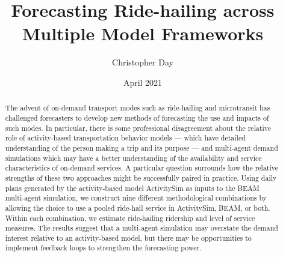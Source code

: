 \documentclass[fancy, masters]{byuthesis}
\title{Forecasting Ride-hailing across\\
\hspace*{0.333em}Multiple Model Frameworks}
\author{Christopher Day}
\date{April 2021}
\begin{document}
	\frontmatter

	\titlepage
	\clearpage

	\customtitlepage
	\clearpage


    \begin{abstract}
  The advent of on-demand transport modes such as ride-hailing and microtransit has challenged forecasters to develop new methods of forecasting the use and impacts of such modes. In particular, there is some professional disagreement about the relative role of activity-based transportation behavior models --- which have detailed understanding of the person making a trip and its purpose --- and multi-agent demand simulations which may have a better understanding of the availability and service characteristics of on-demand services. A particular question surrounds how the relative strengths of these two approaches might be successfully paired in practice. Using daily plans generated by the activity-based model ActivitySim as inputs to the BEAM multi-agent simulation, we construct nine different methodological combinations by allowing the choice to use a pooled ride-hail service in ActivitySim, BEAM, or both. Within each combination, we estimate ride-hailing ridership and level of service measures. The results suggest that a multi-agent simulation may overstate the demand interest relative to an activity-based model, but there may be opportunities to implement feedback loops to strengthen the forecasting power.
  \end{abstract}
  	\clearpage
\end{document}

